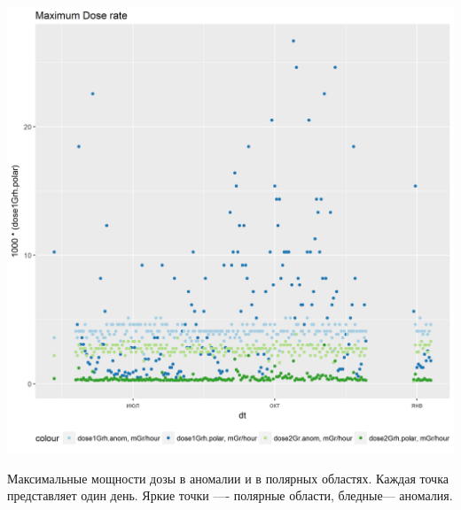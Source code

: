 \documentclass[t, aspectratio=43]{beamer}
\begin{document}
\begin{frame}	
\frametitle{\insertsection} 
\framesubtitle{\insertsubsection} 

\begin{center}
	\includegraphics[width=0.6\linewidth]{images/resmaxdosepolaranomboth}
\end{center}

{\tiny Максимальные мощности дозы в аномалии и в полярных областях. Каждая точка представляет один день. Яркие точки ---- полярные области, бледные---  аномалия. 

}
\end{frame}

\end{document}
